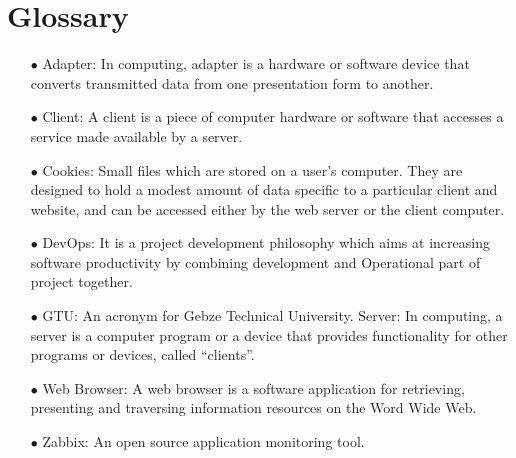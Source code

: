\documentclass{article}
\begin{document}
\section{Glossary}
\begin{itemize}
\item[$\bullet$]Adapter: In computing, adapter is a hardware or software device that converts transmitted data from one presentation form to another.
\item[$\bullet$] Client: A client is a piece of computer hardware or software that accesses a service made available by a server.
\item[$\bullet$] Cookies: Small files which are stored on a user's computer. They are  designed to hold a modest amount of data specific to a particular client and website, and can be accessed either by the web server or the client computer.
\item[$\bullet$] DevOps: It is a project development philosophy which aims at increasing software         
            productivity by combining development and Operational part of project  together.
\item[$\bullet$]GTU: An acronym for Gebze Technical University.
Server: In computing, a server is a computer program or a device that provides functionality for other programs or devices, called “clients”.
\item[$\bullet$] Web Browser: A web browser is a software application for retrieving, presenting and traversing information resources on the Word Wide Web.
\item[$\bullet$] Zabbix: An open source application monitoring tool.
\end{itemize}
\end{document}
